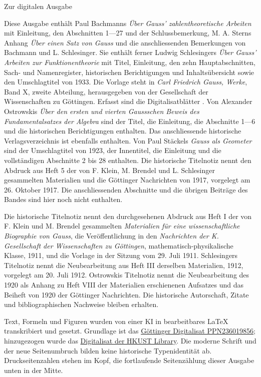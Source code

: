 \clearpage\NoSourceHead
\begin{center}\large Zur digitalen Ausgabe\end{center}
Diese Ausgabe enthält Paul Bachmanns \textit{Über Gauss’ zahlentheoretische Arbeiten} mit Einleitung, den Abschnitten 1—27 und der Schlussbemerkung, M. A. Sterns Anhang \textit{Über einen Satz von Gauss} und die anschliessenden Bemerkungen von Bachmann und L. Schlesinger. Sie enthält ferner Ludwig Schlesingers \textit{Über Gauss’ Arbeiten zur Funktionentheorie} mit Titel, Einleitung, den zehn Hauptabschnitten, Sach- und Namenregister, historischen Berichtigungen und Inhaltsübersicht sowie den Umschlagtitel von 1933. Die Vorlage steht in \textit{Carl Friedrich Gauss, Werke}, Band X, zweite Abteilung, herausgegeben von der Gesellschaft der Wissenschaften zu Göttingen. Erfasst sind die Digitalisatblätter \SourceScope. Von Alexander Ostrowskis \textit{Über den ersten und vierten Gaussschen Beweis des Fundamentalsatzes der Algebra} sind der Titel, die Einleitung, die Abschnitte 1—6 und die historischen Berichtigungen enthalten. Das anschliessende historische Verlagsverzeichnis ist ebenfalls enthalten. Von Paul Stäckels \textit{Gauss als Geometer} sind der Umschlagtitel von 1923, der Innentitel, die Einleitung und die vollständigen Abschnitte 2 bis 28 enthalten. Die historische Titelnotiz nennt den Abdruck aus Heft 5 der von F. Klein, M. Brendel und L. Schlesinger gesammelten Materialien und die Göttinger Nachrichten von 1917, vorgelegt am 26. Oktober 1917. Die anschliessenden Abschnitte und die übrigen Beiträge des Bandes sind hier noch nicht enthalten.

Die historische Titelnotiz nennt den durchgesehenen Abdruck aus Heft I der von F. Klein und M. Brendel gesammelten \textit{Materialien für eine wissenschaftliche Biographie von Gauss}, die Veröffentlichung in den \textit{Nachrichten der K. Gesellschaft der Wissenschaften zu Göttingen}, mathematisch-physikalische Klasse, 1911, und die Vorlage in der Sitzung vom 29. Juli 1911. Schlesingers Titelnotiz nennt die Neubearbeitung aus Heft III derselben Materialien, 1912, vorgelegt am 20. Juli 1912. Ostrowskis Titelnotiz nennt die Neubearbeitung des 1920 als Anhang zu Heft VIII der Materialien erschienenen Aufsatzes und das Beiheft von 1920 der Göttinger Nachrichten. Die historische Autorschaft, Zitate und bibliographischen Nachweise bleiben erhalten.

Text, Formeln und Figuren wurden von einer KI in bearbeitbares LaTeX transkribiert und gesetzt. Grundlage ist das \href{https://gdz.sub.uni-goettingen.de/id/PPN236019856}{Göttinger Digitalisat PPN236019856}; hinzugezogen wurde das \href{https://lbezone.hkust.edu.hk/obj/4/o/b761099/v10,2/pg00009.jpg}{Digitalisat der HKUST Library}. Die moderne Schrift und der neue Seitenumbruch bilden keine historische Typenidentität ab. Druckseitenzahlen stehen im Kopf, die fortlaufende Seitenzählung dieser Ausgabe unten in der Mitte.

